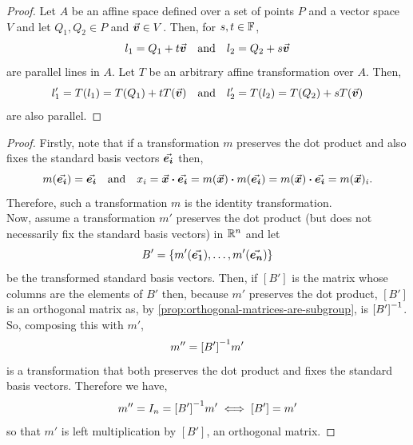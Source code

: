 \documentclass[MathsNotesBase.tex]{subfiles}
\begin{document}
{	\medskip
	
	\medskip
	\begin{proof}
		Let $A$ be an affine space defined over a set of points $P$ and a vector space $V$ and let ${ Q_1,Q_2 \in P }$ and ${ \vec{\bm{v}} \in V }$. Then, for ${ s,t \in \mathbb{F}^{} }$,
		\[ l_1 = Q_1 + t\vec{\bm{v}} \hspace{10pt}\text{and}\hspace{10pt} l_2 = Q_2 + s\vec{\bm{v}} \]
		are parallel lines in $A$. Let $T$ be an arbitrary affine transformation over $A$. Then,
		\[ l_1' = T(l_1) = T(Q_1) + tT(\vec{\bm{v}}) \hspace{10pt}\text{and}\hspace{10pt} l_2' = T(l_2) = T(Q_2) + sT(\vec{\bm{v}}) \]
		are also parallel.
	\end{proof}

	\medskip
	\begin{proof}
		Firstly, note that if a transformation $m$ preserves the dot product and also fixes the standard basis vectors $\vec{\bm{e_i}}$ then,
		\[ m(\vec{\bm{e_i}}) = \vec{\bm{e_i}} \hspace{10pt}\text{and}\hspace{10pt} x_i = \vec{\bm{x}} \boldsymbol{\cdot} \vec{\bm{e_i}} = m(\vec{\bm{x}}) \boldsymbol{\cdot} m(\vec{\bm{e_i}}) = m(\vec{\bm{x}}) \boldsymbol{\cdot} \vec{\bm{e_i}} = m(\vec{\bm{x}})_i. \]
		Therefore, such a transformation $m$ is the identity transformation.\\
		Now, assume a transformation $m'$ preserves the dot product (but does not necessarily fix the standard basis vectors) in $\mathbb{R}^{n}$ and let 
		\[ B' = \{ m'(\vec{\bm{e_1}}),\dots,m'(\vec{\bm{e_n}}) \} \]
		be the transformed standard basis vectors. Then, if $[B']$ is the matrix whose columns are the elements of $B'$ then, because $m'$ preserves the dot product, $[B']$ is an orthogonal matrix as, by \autoref{prop:orthogonal-matrices-are-subgroup}, is ${[B']}^{-1}$. So, composing this with $m'$,
		\[ m'' = {[B']}^{-1}m' \]
		is a transformation that both preserves the dot product and fixes the standard basis vectors. Therefore we have,
		\[ m'' = I_n = {[B']}^{-1}m' \iff [B'] = m' \]
		so that $m'$ is left multiplication by $[B']$, an orthogonal matrix.
	\end{proof}

}
\end{document}
